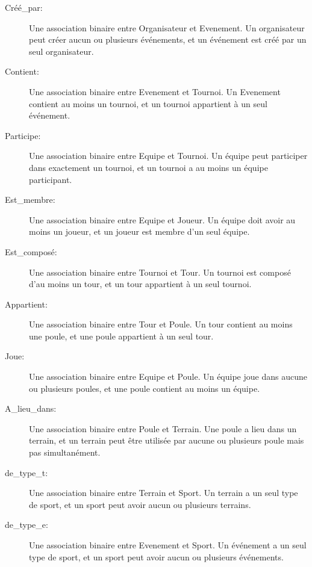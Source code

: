 \documentclass[a4paper,12pt]{report}   %
\begin{document}
\begin{description}

\item[Créé\_par:] Une association binaire entre Organisateur et Evenement. Un organisateur peut créer aucun ou plusieurs événements, et un événement est créé par un seul organisateur.\\

\item[Contient:] Une association binaire entre Evenement et Tournoi. Un Evenement contient au moins un tournoi, et un tournoi appartient à un seul événement. \\

\item[Participe:]Une association binaire entre Equipe et Tournoi. Un équipe peut participer dans exactement un tournoi, et un tournoi a au moins un équipe participant.\\

\item[Est\_membre:] Une association binaire entre Equipe et Joueur. Un équipe doit avoir au moins un joueur, et un joueur est membre d'un seul équipe.\\

\item[Est\_composé:] Une association binaire entre Tournoi et Tour. Un tournoi est composé d'au moins un tour, et un tour appartient à un seul tournoi.\\

\item[Appartient:] Une association binaire entre Tour et Poule. Un tour contient au moins une poule, et une poule appartient à un seul tour.\\

\item[Joue:] Une association binaire entre Equipe et Poule. Un équipe joue dans aucune ou plusieurs poules, et une poule contient au moins un équipe.\\

\item[A\_lieu\_dans:] Une association binaire entre Poule et Terrain. Une poule a lieu dans un terrain, et un terrain peut être utilisée par aucune ou plusieurs poule mais pas simultanément.\\

\item[de\_type\_t:] Une association binaire entre Terrain et Sport. Un terrain a un seul type de sport, et un sport peut avoir aucun ou plusieurs terrains.\\

\item[de\_type\_e:] Une association binaire entre Evenement et Sport. Un événement a un seul type de sport, et un sport peut avoir aucun ou plusieurs événements.\\

\end{description}
\end{document}
